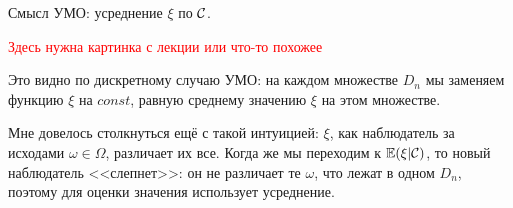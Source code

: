 \begin{note}
    Смысл УМО: усреднение $\xi$ по $\mathcal{C}$.

    \textcolor{red}{Здесь нужна картинка с лекции или что-то похожее}

    Это видно по дискретному случаю УМО: на каждом множестве $D_n$ мы заменяем функцию $\xi$ на $const$, равную среднему значению $\xi$ на этом множестве.
\end{note}

\begin{anote}
	Мне довелось столкнуться ещё с такой интуицией: $\xi$, как наблюдатель за исходами $\omega \in \Omega$, различает их все. Когда же мы переходим к $\mathbb{E}(\xi|\mathcal{C})$, то новый наблюдатель <<слепнет>>: он не различает те $\omega$, что лежат в одном $D_n$, поэтому для оценки значения использует усреднение.
\end{anote}